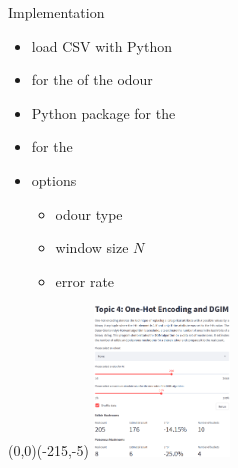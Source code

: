 \begin{frame}{Implementation}
	\begin{itemize}
		\item
		load CSV with Python

		\item
		 for the  of the odour
		
		\item
		Python package  for the 
		
		\item
		 for the 
		
		\item
		options
		\begin{itemize}
			\item
			odour type
			
			\item
			window size $N$
			
			\item
			error rate
		\end{itemize}
	\end{itemize}

	\begin{picture}(0,0)(-215,-5)
		\includegraphics[height=4cm]{images/overview.png}
	\end{picture}
\end{frame}


